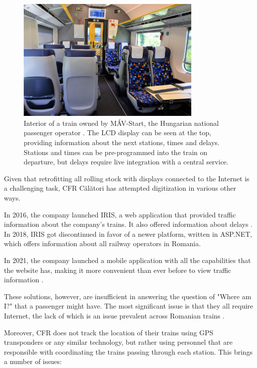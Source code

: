 \begin{figure}[htbp]
    \centering
    \includegraphics[width=0.8\textwidth]{./figures/ch1_mav-interior.png}
    \caption{Interior of a train owned by MÁV-Start, the Hungarian national passenger operator \cite{PestiHirlapMAVInterior}. The LCD display can be seen at the top, providing information about the next stations, times and delays. Stations and times can be pre-programmed into the train on departure, but delays require live integration with a central service.}
    \label{FigMAVInterior}
\end{figure}

Given that retrofitting all rolling stock with displays connected to the Internet is a challenging task, CFR Călători has attempted digitization in various other ways.

In 2016, the company launched IRIS, a web application that provided traffic information about the company's trains. It also offered information about delays \cite{StiriDeClujLansareCFRIris}. In 2018, IRIS got discontinued in favor of a newer platform, written in ASP.NET, which offers information about all railway operators in Romania.

In 2021, the company launched a mobile application with all the capabilities that the website has, making it more convenient than ever before to view traffic information \cite{MobilissimoCFRLansareMobil}.

These solutions, however, are insufficient in answering the question of "Where am I?" that a passenger might have. The most significant issue is that they all require Internet, the lack of which is an issue prevalent across Romanian trains \cite{CFRInternetIC}.

Moreover, CFR does not track the location of their trains using GPS transponders or any similar technology, but rather using personnel that are responsible with coordinating the trains passing through each station. This brings a number of issues:

